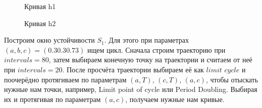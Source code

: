 \documentclass[12pt, a4paper]{article}
\begin{document}
\begin{figure}[H]
	\caption{Кривая h1}
\end{figure}

\begin{figure}[H]
	\caption{Кривая h2}
\end{figure}

Построим окно устойчивости $S_1$. Для этого при параметрах $(a, b, c) = (0.3 0.3 0.73)$ ищем цикл. Сначала строим траекторию при $intervals = 80$, затем выбираем конечную точку на траектории и считаем от неё при $intervals = 20$. После просчёта траектории выбираем её как $limit$ $cycle$ и поочерёдно протягиваем по параметрам $(a, T)$, $(c, T)$, $(a, c)$, чтобы отыскать нужные нам точки, например, Limit point of cycle или Period Doubling. Выбирая их и протягивая по параметрам $(a, c)$, получаем нужные нам кривые.
\end{document}
